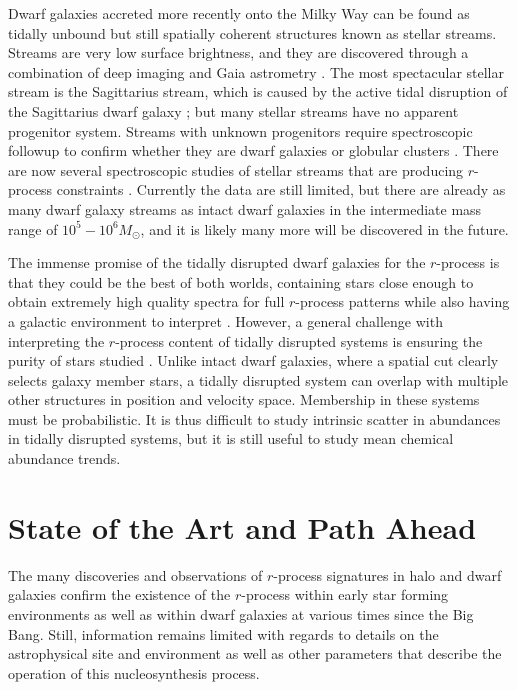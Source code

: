 \documentclass[letterpaper]{article}
\begin{document}
Dwarf galaxies accreted more recently onto the Milky Way can be found as tidally unbound but still spatially coherent structures known as stellar streams.
Streams are very low surface brightness, and they are discovered through a combination of deep imaging and Gaia astrometry \citep[e.g.,][]{Belokurov2006,Grillmair2009,Shipp2018,Ibata2019}.
The most spectacular stellar stream is the Sagittarius stream, which is caused by the active tidal disruption of the Sagittarius dwarf galaxy \citep{Majewski2004}; but many stellar streams have no apparent progenitor system.
Streams with unknown progenitors require spectroscopic followup to confirm whether they are dwarf galaxies or globular clusters \citep[e.g.,][]{Li2022}.
There are now several spectroscopic studies of stellar streams that are producing  $r$-process constraints \citep[e.g.,][]{Roederer10,Casey2014,Ji2020b,Hansen2021,gull21,Limberg2021}.
Currently the data are still limited, but there are already as many dwarf galaxy streams as intact dwarf galaxies in the intermediate mass range of $10^5-10^6 M_\odot$, and it is likely many more will be discovered in the future.

The immense promise of the tidally disrupted dwarf galaxies for the $r$-process is that they could be the best of both worlds, containing stars close enough to obtain extremely high quality spectra for full $r$-process patterns while also having a galactic environment to interpret \citep[e.g.,][]{Naidu2022}.
However, a general challenge with interpreting the $r$-process content of tidally disrupted systems is ensuring the purity of stars studied \citep[e.g.,][]{Limberg2021}. Unlike intact dwarf galaxies, where a spatial cut clearly selects galaxy member stars, a tidally disrupted system can overlap with multiple other structures in position and velocity space. Membership in these systems must be probabilistic. It is thus difficult to study intrinsic scatter in abundances in tidally disrupted systems, but it is still useful to study mean chemical abundance trends.


\section{State of the Art and Path Ahead}\label{sec:conclusion}

The many discoveries and observations of $r$-process signatures in halo and dwarf galaxies confirm the existence of the $r$-process within early star forming environments as well as within dwarf galaxies at various times since the Big Bang. Still, information remains limited with regards to details on the astrophysical site and environment as well as other parameters that describe the operation of this nucleosynthesis process. 
\end{document}
